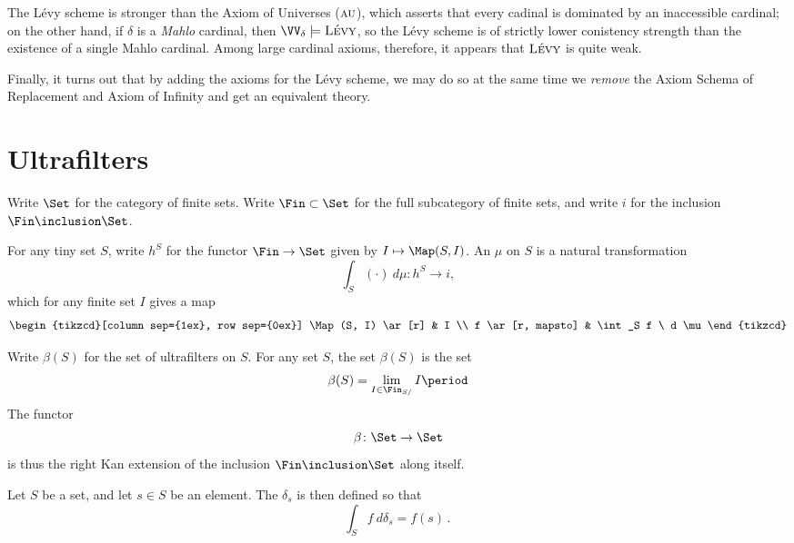 The Lévy scheme is stronger than the Axiom of Universes ($\textsc{au}$), which asserts that every cadinal is dominated by an inaccessible cardinal;
on the other hand, if $\delta$ is a \emph{Mahlo} cardinal, then $\VV_{\delta}\models\textsc{Lévy}$, so the Lévy scheme is of strictly lower conistency strength than the existence of a single Mahlo cardinal. Among large cardinal axioms, therefore, it appears that $\textsc{Lévy}$ is quite weak.

Finally, it turns out that by adding the axioms for the Lévy scheme, we may do so at the same time we \emph{remove} the Axiom Schema of Replacement and Axiom of Infinity and get an equivalent theory.

\section{Ultrafilters}%
\label{sec:ultrafilters}

\begin{notation}
	Write $ \Set $ for the category of finite sets.
	Write $ \Fin \subset \Set $ for the full subcategory of finite sets,
	and write $ i $ for the inclusion $ \Fin \inclusion \Set $.
\end{notation}

\begin{definition}
	For any tiny set $ S $, write $ h^S $ for the functor $ \Fin \to \Set $ given by $ I  \mapsto \Map(S, I) $.
	An  $ \mu $ on $ S $ is a natural transformation
	\[
		\int_S (\cdot) \ d\mu \colon h^S \to i \comma
	\]
	which for any finite set $I$ gives a map
	\[
		\begin{tikzcd}[column sep={1ex}, row sep={0ex}]
			\Map(S, I) \ar[r] & I \\
			f \ar[r, mapsto] & \int_S f \ d \mu
		\end{tikzcd}
	\]

	Write $ \beta (S) $ for the set of ultrafilters on $ S $.
	For any set $ S $, the set $ \beta(S) $ is the set
	\[
		\beta(S) = \lim_{I \in \Fin_{S/}} I \period
	\]
	The functor
	\[
		\beta \colon \Set \to \Set
	\]
	is thus the right Kan extension of the inclusion $ \Fin \inclusion \Set $ along itself.
\end{definition}

\begin{eg}
	Let $ S $ be a set, and let $ s \in S $ be an element.
	The  $ \delta_s $ is then defined so that
	\[
		\int_S f \ d \delta_s = f(s) \period
	\]
\end{eg}

